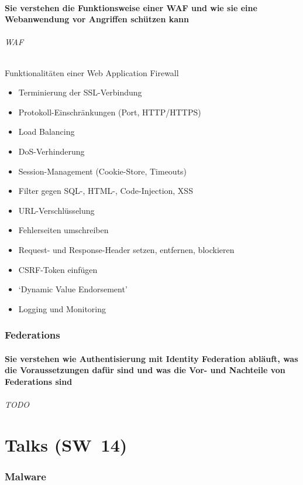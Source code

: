 \documentclass[10pt,a4paper]{article}
\begin{document}
\subsection*{Sie verstehen die Funktionsweise einer WAF und wie sie eine Webanwendung vor Angriffen schützen kann}
\paragraph*{WAF}Funktionalitäten einer Web Application Firewall
\begin{itemize}[noitemsep,topsep=0pt,leftmargin=*]
    \item Terminierung der SSL-Verbindung
    \item Protokoll-Einschränkungen (Port, HTTP/HTTPS)
    \item Load Balancing
    \item DoS-Verhinderung
    \item Session-Management (Cookie-Store, Timeouts)
    \item Filter gegen SQL-, HTML-, Code-Injection, XSS
    \item URL-Verschlüsselung
    \item Fehlerseiten umschreiben
    \item Request- und Response-Header setzen, entfernen, blockieren
    \item CSRF-Token einfügen
    \item `Dynamic Value Endorsement'
    \item Logging und Monitoring
\end{itemize}


\section{Federations}
\subsection*{Sie verstehen wie Authentisierung mit Identity Federation abläuft, was die Voraussetzungen dafür sind und was die Vor- und Nachteile von Federations sind}
\paragraph*{TODO}


\part{Talks (SW~14)}
\section{Malware}
\end{document}

